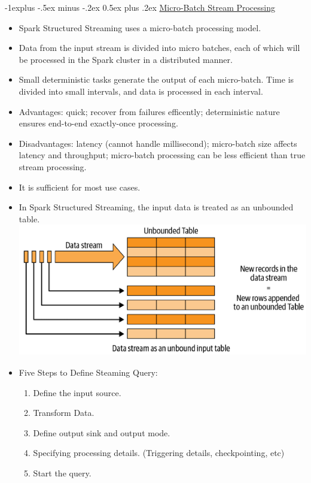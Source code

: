 \documentclass[10pt, landscape]{article}
\makeatletter
\renewcommand{\subsection}{\@startsection{subsection}{2}{0mm}%
  {-1explus -.5ex minus -.2ex}%
  {0.5ex plus .2ex}%
{\normalfont\normalsize\bfseries}}
\makeatother
\begin{document}
\begin{multicols*}{4}
  \subsection{\underline{Micro-Batch Stream Processing}}
  \begin{itemize}
    \item Spark Structured Streaming uses a micro-batch processing model.
    \item Data from the input stream is divided into micro batches, each of which will be processed in the Spark cluster in a distributed manner.
    \item Small deterministic tasks generate the output of each micro-batch. Time is divided into small intervals, and data is processed in each interval.
    \item Advantages: quick; recover from failures efficently; deterministic nature ensures end-to-end exactly-once processing.
    \item Disadvantages: latency (cannot handle millisecond); micro-batch size affects latency and throughput; micro-batch processing can be less efficient than true stream processing.
    \item It is sufficient for most use cases.
    \item In Spark Structured Streaming, the input data is treated as an unbounded table. \includegraphics[width=0.95\linewidth]{spark_stream_unbound_table.png}
    \item Five Steps to Define Steaming Query: 
          \begin{enumerate}
            \item Define the input source.
            \item Transform Data.
            \item Define output sink and output mode.
            \item Specifying processing details. (Triggering details, checkpointing, etc)
            \item Start the query.
          \end{enumerate}
  \end{itemize}


\end{multicols*}
\end{document}
